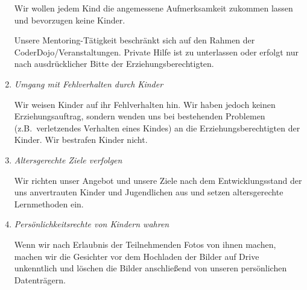 \begin{enumerate}
    Wir wollen jedem Kind die angemessene Aufmerksamkeit zukommen lassen und bevorzugen keine Kinder.

    Unsere Mentoring-Tätigkeit beschränkt sich auf den Rahmen der CoderDojo\-/Veranstaltungen.
    Private Hilfe ist zu unterlassen oder erfolgt nur nach ausdrücklicher Bitte der Erziehungsberechtigten.

    \item \textit{Umgang mit Fehlverhalten durch Kinder}

    Wir weisen Kinder auf ihr Fehlverhalten hin.
    Wir haben jedoch keinen Erziehungsauftrag, sondern wenden uns bei bestehenden Problemen (z.B.\ verletzendes Verhalten eines Kindes) an die Erziehungsberechtigten der Kinder.
    Wir bestrafen Kinder nicht.

    \item \textit{Altersgerechte Ziele verfolgen}

    Wir richten unser Angebot und unsere Ziele nach dem Entwicklungsstand der uns anvertrauten Kinder und Jugendlichen aus und setzen altersgerechte Lernmethoden ein.

    \item \textit{Persönlichkeitsrechte von Kindern wahren}

    Wenn wir nach Erlaubnis der Teilnehmenden Fotos von ihnen machen, machen wir die Gesichter vor dem Hochladen der Bilder auf Drive unkenntlich und löschen die Bilder anschließend von unseren persönlichen Datenträgern.
\end{enumerate}
